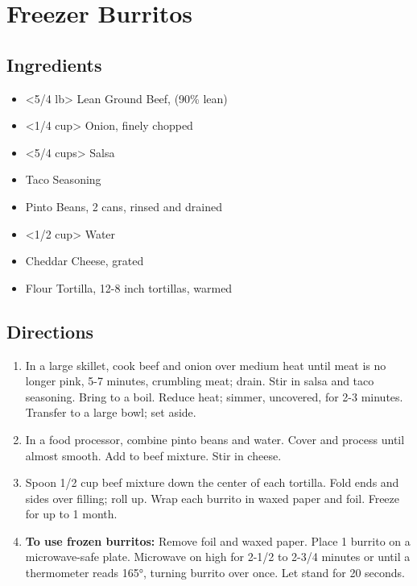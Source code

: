 \section{Freezer Burritos}

\subsection{ Ingredients }

\begin{itemize}
  \item <5/4 lb> Lean Ground Beef, (90\% lean)
  \item <1/4 cup> Onion, finely chopped
  \item <5/4 cups> Salsa
  \item <2 tbs> Taco Seasoning
  \item <30 oz> Pinto Beans, 2 cans, rinsed and drained
  \item <1/2 cup> Water
  \item <2 cups> Cheddar Cheese, grated
  \item <408 g> Flour Tortilla, 12-8 inch tortillas, warmed
\end{itemize}

\subsection{ Directions }

\begin{enumerate}
  \item In a large skillet, cook beef and onion over medium heat until meat is no longer pink, 5-7 minutes, crumbling meat; drain. Stir in salsa and taco seasoning. Bring to a boil. Reduce heat; simmer, uncovered, for 2-3 minutes. Transfer to a large bowl; set aside.
  \item In a food processor, combine pinto beans and water. Cover and process until almost smooth. Add to beef mixture. Stir in cheese.
  \item Spoon 1/2 cup beef mixture down the center of each tortilla. Fold ends and sides over filling; roll up. Wrap each burrito in waxed paper and foil. Freeze for up to 1 month.
  \item \textbf{To use frozen burritos:} Remove foil and waxed paper. Place 1 burrito on a microwave-safe plate. Microwave on high for 2-1/2 to 2-3/4 minutes or until a thermometer reads 165°, turning burrito over once. Let stand for 20 seconds.
\end{enumerate}
